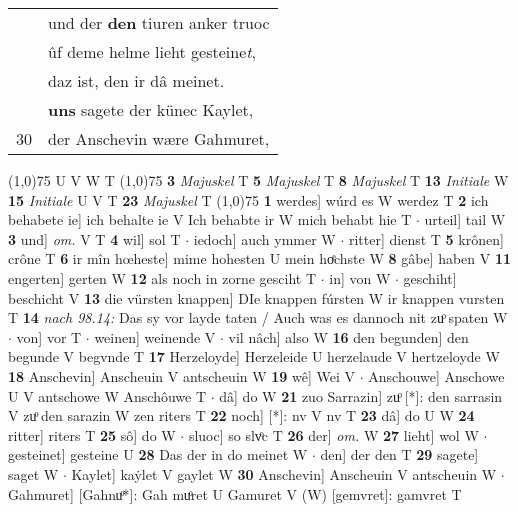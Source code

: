 \documentclass[8pt,a4paper,notitlepage]{article}
\begin{document}
\begin{table}[ht]
\begin{minipage}[t]{0.5\linewidth}
\begin{tabular}{rl}
 & und der \textbf{den} tiuren anker truoc\\ 
 & ûf deme helme lieht gesteine\textit{t},\\ 
 & daz ist, den ir dâ meinet.\\ 
 & \textbf{uns} sagete der künec Kaylet,\\ 
30 & der Anschevin wære Gahmuret,\\ 
\end{tabular}
\scriptsize
\line(1,0){75} \newline
U V W T \newline
\line(1,0){75} \newline
\textbf{3} \textit{Majuskel} T  \textbf{5} \textit{Majuskel} T  \textbf{8} \textit{Majuskel} T  \textbf{13} \textit{Initiale} W  \textbf{15} \textit{Initiale} U V T  \textbf{23} \textit{Majuskel} T  \newline
\line(1,0){75} \newline
\textbf{1} werdes] wúrd es W werdez T \textbf{2} ich behabete ie] ich behalte ie V Ich behabte ir W mich behabt hie T  $\cdot$ urteil] tail W \textbf{3} und] \textit{om.} V T \textbf{4} wil] sol T  $\cdot$ iedoch] auch ymmer W  $\cdot$ ritter] dienst T \textbf{5} krônen] crône T \textbf{6} ir mîn hœheste] mime hohesten U mein hoͤchste W \textbf{8} gâbe] haben V \textbf{11} engerten] gerten W \textbf{12} als noch in zorne gesciht T  $\cdot$ in] von W  $\cdot$ geschiht] beschicht V \textbf{13} die vürsten knappen] DIe knappen fúrsten W ir knappen vursten T \textbf{14} \textit{nach 98.14:} Das sy vor layde taten / Auch was es dannoch nit zuͦ spaten W   $\cdot$ von] vor T  $\cdot$ weinen] weinende V  $\cdot$ vil nâch] also W \textbf{16} den begunden] den begunde V begvnde T \textbf{17} Herzeloyde] Herzeleide U herzelaude V hertzeloyde W \textbf{18} Anschevin] Anscheuin V antscheuin W \textbf{19} wê] Wei V  $\cdot$ Anschouwe] Anschowe U V antschowe W Anschôuwe T  $\cdot$ dâ] do W \textbf{21} zuo Sarrazin] zuͦ [*]: den sarrasin V zuͦ den sarazin W zen riters T \textbf{22} noch] [*]: nv V nv T \textbf{23} dâ] do U W \textbf{24} ritter] riters T \textbf{25} sô] do W  $\cdot$ sluoc] so slvͦc T \textbf{26} der] \textit{om.} W \textbf{27} lieht] wol W  $\cdot$ gesteinet] gesteine U \textbf{28} Das der in do meinet W  $\cdot$ den] der den T \textbf{29} sagete] saget W  $\cdot$ Kaylet] kaẏlet V gaylet W \textbf{30} Anschevin] Anscheuin V antscheuin W  $\cdot$ Gahmuret] [Gahnuͦ*]: Gah muͦret U Gamuret V (W) [gemvret]: gamvret  T \newline
\end{minipage}
\end{table}
\end{document}
